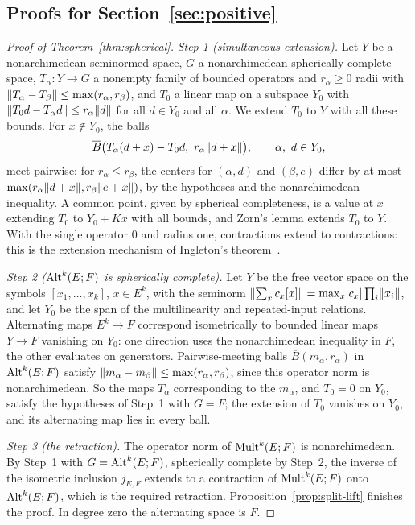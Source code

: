 \subsection{Proofs for Section~\ref{sec:positive}}\label{dfr:ssec:positive}

\begin{proof}[Proof of Theorem~\ref{thm:spherical}]
\emph{Step 1 (simultaneous extension).} Let $Y$ be a nonarchimedean seminormed space, $G$ a nonarchimedean
spherically complete space, $T_\alpha\colon Y\to G$ a nonempty family of bounded operators and $r_\alpha\ge0$ radii with
$\lVert T_\alpha-T_\beta\rVert\le\max(r_\alpha,r_\beta)$, and $T_0$ a linear map on a subspace $Y_0$ with
$\lVert T_0d-T_\alpha d\rVert\le r_\alpha\lVert d\rVert$ for all $d\in Y_0$ and all $\alpha$. We extend $T_0$ to $Y$ with all
these bounds. For $x\notin Y_0$, the balls
\[
 \overline B\bigl(T_\alpha(d+x)-T_0d,\ r_\alpha\lVert d+x\rVert\bigr),
 \qquad \alpha,\ d\in Y_0,
\]
meet pairwise: for $r_\alpha\le r_\beta$, the centers for $(\alpha,d)$ and $(\beta,e)$ differ by at most
$\max(r_\alpha\lVert d+x\rVert,r_\beta\lVert e+x\rVert)$, by the hypotheses and the nonarchimedean inequality. A common point, given
by spherical completeness, is a value at $x$ extending $T_0$ to $Y_0+Kx$ with all bounds, and Zorn's lemma extends $T_0$
to $Y$. With the single operator $0$ and radius one, contractions extend to contractions: this is the extension
mechanism of Ingleton's theorem~\cite{In}.

\emph{Step 2 ($\operatorname{Alt}^k(E;F)$ is spherically complete).} Let $Y$ be the free vector space on the symbols
$[x_1,\ldots,x_k]$, $x\in E^k$, with the seminorm $\lVert \sum_x c_x[x]\rVert=\max_x\lvert c_x\rvert\prod_i\lVert x_i\rVert$, and let $Y_0$
be the span of the multilinearity and repeated-input relations. Alternating maps $E^k\to F$ correspond isometrically to
bounded linear maps $Y\to F$ vanishing on $Y_0$: one direction uses the nonarchimedean inequality in $F$, the other
evaluates on generators. Pairwise-meeting balls $\overline B(m_\alpha,r_\alpha)$ in $\operatorname{Alt}^k(E;F)$ satisfy
$\lVert m_\alpha-m_\beta\rVert\le\max(r_\alpha,r_\beta)$, since this operator norm is nonarchimedean. So the maps $T_\alpha$
corresponding to the $m_\alpha$, and $T_0=0$ on $Y_0$, satisfy the hypotheses of Step~1 with $G=F$; the extension of
$T_0$ vanishes on $Y_0$, and its alternating map lies in every ball.

\emph{Step 3 (the retraction).} The operator norm of $\operatorname{Mult}^k(E;F)$ is nonarchimedean. By Step~1 with
$G=\operatorname{Alt}^k(E;F)$, spherically complete by Step~2, the inverse of the isometric inclusion $j_{E,F}$ extends to a contraction
of $\operatorname{Mult}^k(E;F)$ onto $\operatorname{Alt}^k(E;F)$, which is the required retraction. Proposition~\ref{prop:split-lift} finishes the
proof. In degree zero the alternating space is $F$.
\end{proof}

